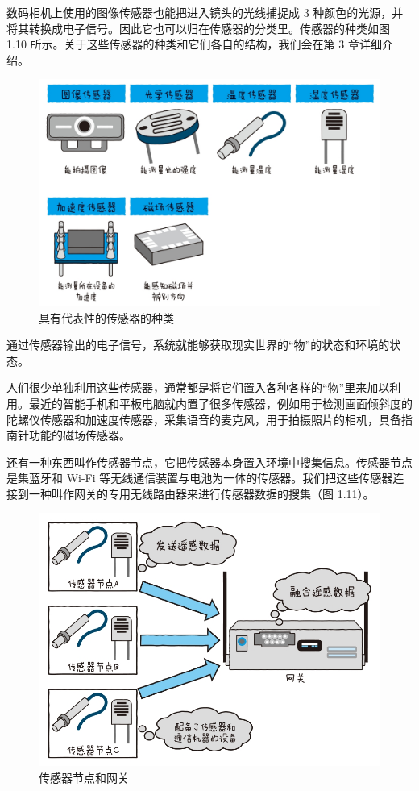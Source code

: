 \documentclass[12pt,UTF8]{ctexbook}
\begin{document}
数码相机上使用的图像传感器也能把进入镜头的光线捕捉成 3 种颜色的光源，并将其转换成电子信号。因此它也可以归在传感器的分类里。传感器的种类如图 1.10 所示。关于这些传感器的种类和它们各自的结构，我们会在第 3 章详细介绍。

\begin{figure}[htbp]
	\centering
	\includegraphics[width=1\linewidth]{10}
	\caption{具有代表性的传感器的种类}
	\label{fig:1}
\end{figure}

通过传感器输出的电子信号，系统就能够获取现实世界的“物”的状态和环境的状态。

人们很少单独利用这些传感器，通常都是将它们置入各种各样的“物”里来加以利用。最近的智能手机和平板电脑就内置了很多传感器，例如用于检测画面倾斜度的陀螺仪传感器和加速度传感器，采集语音的麦克风，用于拍摄照片的相机，具备指南针功能的磁场传感器。

还有一种东西叫作传感器节点，它把传感器本身置入环境中搜集信息。传感器节点是集蓝牙和 Wi-Fi 等无线通信装置与电池为一体的传感器。我们把这些传感器连接到一种叫作网关的专用无线路由器来进行传感器数据的搜集（图 1.11）。

\begin{figure}[htbp]
	\centering
	\includegraphics[width=1\linewidth]{11}
	\caption{传感器节点和网关}
	\label{fig:1}
\end{figure}
\end{document}
